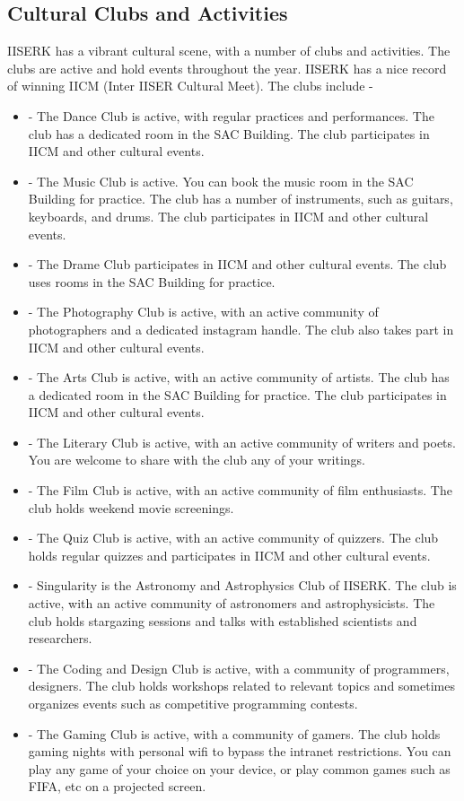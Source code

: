 \documentclass[openany]{book}
\begin{document}
\subsection{Cultural Clubs and Activities}
IISERK has a vibrant cultural scene, with a number of clubs and activities. The clubs are active and hold events throughout the year. IISERK has a nice record of winning IICM (Inter IISER Cultural Meet). The clubs include -
\begin{itemize}
    \item {} - The Dance Club is active, with regular practices and performances. The club has a dedicated room in the SAC Building. The club participates in IICM and other cultural events.
    \item {} - The Music Club is active. You can book the music room in the SAC Building for practice. The club has a number of instruments, such as guitars, keyboards, and drums. The club participates in IICM and other cultural events.
    \item {} - The Drame Club participates in IICM and other cultural events. The club uses rooms in the SAC Building for practice.
    \item {} - The Photography Club is active, with an active community of photographers and a dedicated instagram handle. The club also takes part in IICM and other cultural events. 
    \item {} - The Arts Club is active, with an active community of artists. The club has a dedicated room in the SAC Building for practice. The club participates in IICM and other cultural events.
    \item {} - The Literary Club is active, with an active community of writers and poets. You are welcome to share with the club any of your writings. 
    \item {} - The Film Club is active, with an active community of film enthusiasts. The club holds weekend movie screenings.
    \item {} - The Quiz Club is active, with an active community of quizzers. The club holds regular quizzes and participates in IICM and other cultural events.
    \item {} - Singularity is the Astronomy and Astrophysics Club of IISERK. The club is active, with an active community of astronomers and astrophysicists. The club holds stargazing sessions and talks with established scientists and researchers.
    \item {} - The Coding and Design Club is active, with a community of programmers, designers. The club holds workshops related to relevant topics and sometimes organizes events such as competitive programming contests. 
    \item {} - The Gaming Club is active, with a community of gamers. The club holds gaming nights with personal wifi to bypass the intranet restrictions. You can play any game of your choice on your device, or play common games such as FIFA, etc on a projected screen. 
\end{itemize}
\end{document}
